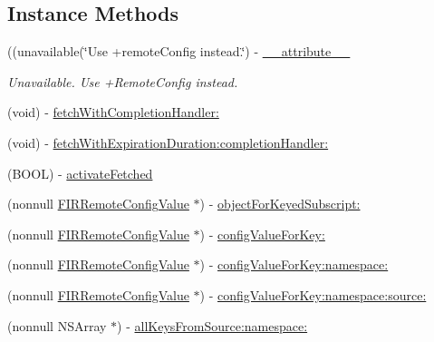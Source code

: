 \subsection*{Instance Methods}
\begin{DoxyCompactItemize}
\item 
\hypertarget{interface_f_i_r_remote_config_a6c8fd86d8485764cdde495fb1a67dd0e}{}((unavailable(\char`\"{}Use +remote\+Config instead.\char`\"{}) -\/ \hyperlink{interface_f_i_r_remote_config_a6c8fd86d8485764cdde495fb1a67dd0e}{\+\_\+\+\_\+attribute\+\_\+\+\_\+}\label{interface_f_i_r_remote_config_a6c8fd86d8485764cdde495fb1a67dd0e}

\begin{DoxyCompactList}\small\item\em Unavailable. Use +\+Remote\+Config instead. \end{DoxyCompactList}\item 
(void) -\/ \hyperlink{interface_f_i_r_remote_config_ab41c9bf417ffff17fb473b6d6d92ffc0}{fetch\+With\+Completion\+Handler\+:}
\item 
(void) -\/ \hyperlink{interface_f_i_r_remote_config_a14b69977b64a6cbca7e65fc5fcd06379}{fetch\+With\+Expiration\+Duration\+:completion\+Handler\+:}
\item 
(B\+O\+O\+L) -\/ \hyperlink{interface_f_i_r_remote_config_ac0638d81208dba93c5fa5b539268bbcc}{activate\+Fetched}
\item 
(nonnull \hyperlink{interface_f_i_r_remote_config_value}{F\+I\+R\+Remote\+Config\+Value} $\ast$) -\/ \hyperlink{interface_f_i_r_remote_config_a7cd30fac1d3d2cd0c0ec362ee4bd5817}{object\+For\+Keyed\+Subscript\+:}
\item 
(nonnull \hyperlink{interface_f_i_r_remote_config_value}{F\+I\+R\+Remote\+Config\+Value} $\ast$) -\/ \hyperlink{interface_f_i_r_remote_config_a3219d5ac3411efb16b429019fa05be29}{config\+Value\+For\+Key\+:}
\item 
(nonnull \hyperlink{interface_f_i_r_remote_config_value}{F\+I\+R\+Remote\+Config\+Value} $\ast$) -\/ \hyperlink{interface_f_i_r_remote_config_a28b4e0433ace0a2eae4c3cba1198fbb6}{config\+Value\+For\+Key\+:namespace\+:}
\item 
(nonnull \hyperlink{interface_f_i_r_remote_config_value}{F\+I\+R\+Remote\+Config\+Value} $\ast$) -\/ \hyperlink{interface_f_i_r_remote_config_a72766ce7b19e9df8ddf1c148fa9a2198}{config\+Value\+For\+Key\+:namespace\+:source\+:}
\item 
(nonnull N\+S\+Array $\ast$) -\/ \hyperlink{interface_f_i_r_remote_config_aed4e562d0f1e5b4d50cd753ed97351b8}{all\+Keys\+From\+Source\+:namespace\+:}

\end{DoxyCompactItemize}
